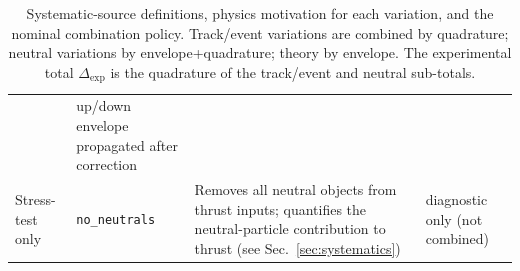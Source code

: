 \begin{table}[t!]
\begin{tabularx}{0.98\textwidth}{p{}p{}p{}X}
  & up/down envelope propagated after correction \\[3pt]
Stress-test only
  & \texttt{no\_neutrals}
  & Removes all neutral objects from thrust inputs; quantifies the neutral-particle contribution to thrust (see Sec.~\ref{sec:systematics})
  & diagnostic only (not combined) \\
\hline
\end{tabularx}
\normalsize
\caption{Systematic-source definitions, physics motivation for each variation, and the nominal combination policy. Track/event variations are combined by quadrature; neutral variations by envelope+quadrature; theory by envelope. The experimental total $\Delta_\mathrm{exp}$ is the quadrature of the track/event and neutral sub-totals.}
\label{tab:systematics_definition}
\end{table}
